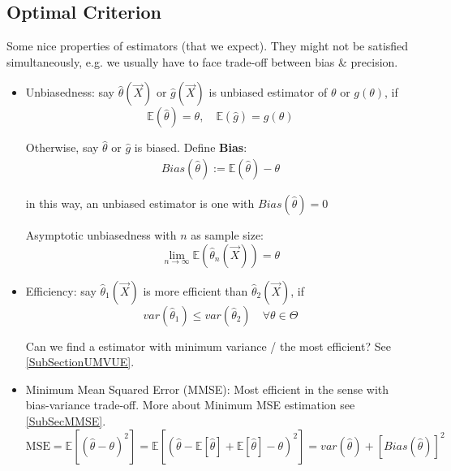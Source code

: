 \subsection{Optimal Criterion}\label{SubSectionOptimalCriterion}
        Some nice properties of estimators (that we expect). They might not be satisfied simultaneously, e.g. we usually have to face trade-off between bias \& precision.
    \begin{itemize}
        \item Unbiasedness: say $\hat{\theta }(\vec{X})$ or $\hat{g}(\vec{X})$ is unbiased estimator of $\theta$ or $g(\theta)$, if
        \begin{equation}
            \mathbb{E}(\hat{\theta})=\theta,\quad \mathbb{E}(\hat{g})=g(\theta)
        \end{equation}

        Otherwise, say $\hat{\theta}$ or $\hat{g}$ is biased. Define \textbf{Bias}:
        \begin{align}
            Bias(\hat{\theta }):= \mathbb{E}(\hat{\theta})-\theta
        \end{align}
        
        in this way, an unbiased estimator is one with $ Bias(\hat{\theta })=0 $

        Asymptotic unbiasedness with $ n $ as sample size:
        \begin{equation}
            \lim_{n\to\infty}  \mathbb{E}(\hat{\theta }_n(\vec{X})) =\theta 
        \end{equation}
        \item Efficiency: say $\hat{\theta }_1(\vec{X})$ is more efficient than $\hat{\theta }_2(\vec{X})$, if
        \begin{equation}
            var(\hat{\theta }_1)\leq var(\hat{\theta }_2)  \quad\forall\theta\in\Theta  
        \end{equation}

        Can we find a estimator with minimum variance / the most efficient? See \autoref{SubSectionUMVUE}.
        \item Minimum Mean Squared Error (MMSE): Most efficient in the sense with bias-variance trade-off. More about Minimum MSE estimation see \autoref{SubSecMMSE}.
        \begin{equation}\label{EqaMSEExpansion}
            \text{MSE}=\mathbb{E}[(\hat{\theta}-\theta)^2]=\mathbb{E}\left[ (\hat{\theta }-\mathbb{E}\left[ \hat{\theta}  \right] +\mathbb{E}\left[ \hat{\theta } \right]-\theta  )^2 \right] =var(\hat{\theta})+[Bias(\hat{\theta})]^2
        \end{equation}


\end{itemize}
